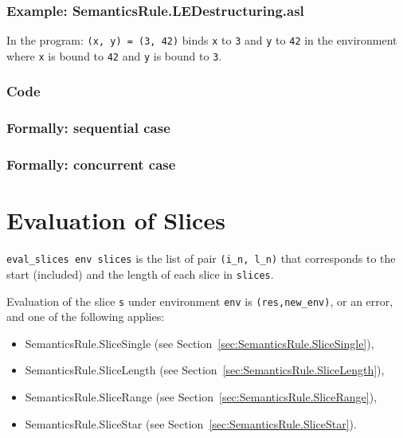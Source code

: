 \documentclass{book}
\begin{document}
    \subsection{Example: SemanticsRule.LEDestructuring.asl}
    In the program:
    \texttt{(x, y) = (3, 42)} binds \texttt{x} to \texttt{3} and \texttt{y} to \texttt{42} in the environment where \texttt{x} is bound to \texttt{42} and \texttt{y} is bound to \texttt{3}.

  \subsection{Code}

\begin{emptyformal}
  \subsection{Formally: sequential case}

  \subsection{Formally: concurrent case}
\end{emptyformal}


\chapter{Evaluation of Slices \label{chap:eval_slices}}
\texttt{eval\_slices env slices} is the list of pair \texttt{(i\_n, l\_n)} that
corresponds to the start (included) and the length of each slice in
\texttt{slices}.

Evaluation of the slice \texttt{s} under environment \texttt{env} is
\texttt{(res,new\_env)}, or an error, and one of the following applies:
\begin{itemize}
\item SemanticsRule.SliceSingle (see Section~\ref{sec:SemanticsRule.SliceSingle}),
\item SemanticsRule.SliceLength (see Section~\ref{sec:SemanticsRule.SliceLength}),
\item SemanticsRule.SliceRange (see Section~\ref{sec:SemanticsRule.SliceRange}),
\item SemanticsRule.SliceStar (see Section~\ref{sec:SemanticsRule.SliceStar}).
\end{itemize}
\end{document}

